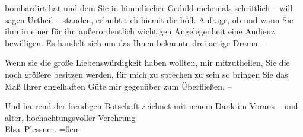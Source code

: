                bombardirt hat und dem Sie in himmlischer Geduld mehrmals schriftlich \label{K_L03701-2v}\label{K_L03701-2} – will sagen
               Urtheil – standen, erlaubt sich hiemit die höfl. Anfrage, ob und wann Sie ihm in
               einer für ihn außerordentlich wichtigen Angelegenheit eine Audienz bewilligen. Es
               handelt sich um das Ihnen bekannte drei-actige Drama. –\pend
           
\pstart
           Wenn sie die große Liebenswürdigkeit haben wollten, mir mitzutheilen, \label{K_L03701-3v}\label{K_L03701-3} Sie die
               noch größere besitzen {\pb}werden, für mich zu sprechen zu
               sein so bringen Sie das Maß Ihrer engelhaften Güte mir gegenüber zum Überfließen.
               –\pend
           
\pstart
           Und harrend der freudigen Botschaft zeichnet mit neuem Dank im Voraus – und
               alter, hochachtungsvoller Verehrung{\\[\baselineskip]}\spacefill\mbox{Elsa Plessner.}\pend
           \leftskip=0em{}\endnumbering{}  \newcommand{\dateiname}{L03701}\newcommand{\titel}{Elsa Plessner an Arthur Schnitzler, 14. 9. 1896}\newcommand{\editorInnen}{Selma Jahnke und Martin Anton Müller}
